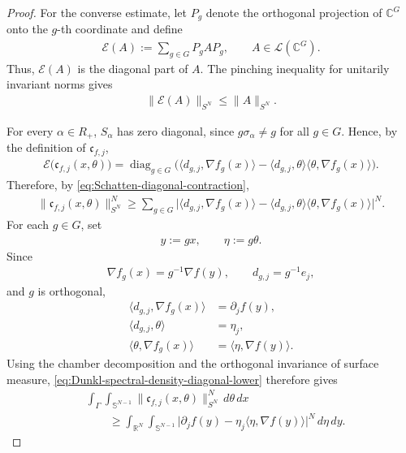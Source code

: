 \documentclass{amsart}
\begin{document}
\begin{proof}
For the converse estimate, let \(P_g\) denote the orthogonal projection
of \(\mathbb C^G\) onto the \(g\)-th coordinate and define
\begin{align*}
\mathcal E(A)
:=
\sum_{g\in G}P_gAP_g,
\qquad
A\in\mathcal L(\mathbb C^G).
\end{align*}
Thus, \(\mathcal E(A)\) is the diagonal part of \(A\). The pinching
inequality for unitarily invariant norms
\cite[p.~97, (IV.51)--(IV.52)]{BhatiaMatrixAnalysis} gives
\begin{align}
\|\mathcal E(A)\|_{S^N}
\leq
\|A\|_{S^N}.
\label{eq:Schatten-diagonal-contraction}
\end{align}

For every \(\alpha\in R_+\), \(S_\alpha\) has zero diagonal, since
\(g\sigma_\alpha\neq g\) for all \(g\in G\). Hence, by the definition
of \(\mathfrak c_{f,j}\),
\begin{align*}
\mathcal E\big(\mathfrak c_{f,j}(x,\theta)\big)
=
\operatorname{diag}_{g\in G}
\bigg(
\langle d_{g,j},\nabla f_g(x)\rangle
-
\langle d_{g,j},\theta\rangle
\langle\theta,\nabla f_g(x)\rangle
\bigg).
\end{align*}
Therefore, by \eqref{eq:Schatten-diagonal-contraction},
\begin{align}
\|\mathfrak c_{f,j}(x,\theta)\|_{S^N}^N
\geq
\sum_{g\in G}
\big|
\langle d_{g,j},\nabla f_g(x)\rangle
-
\langle d_{g,j},\theta\rangle
\langle\theta,\nabla f_g(x)\rangle
\big|^N.
\label{eq:Dunkl-spectral-density-diagonal-lower}
\end{align}
For each \(g\in G\), set
\begin{align*}
y:=gx,
\qquad
\eta:=g\theta.
\end{align*}
Since
\begin{align*}
\nabla f_g(x)
=
g^{-1}\nabla f(y),
\qquad
d_{g,j}=g^{-1}e_j,
\end{align*}
and \(g\) is orthogonal,
\begin{align*}
\langle d_{g,j},\nabla f_g(x)\rangle
&=
\partial_j f(y),\\
\langle d_{g,j},\theta\rangle
&=
\eta_j,\\
\langle\theta,\nabla f_g(x)\rangle
&=
\langle\eta,\nabla f(y)\rangle.
\end{align*}
Using the chamber decomposition and the orthogonal invariance of
surface measure, \eqref{eq:Dunkl-spectral-density-diagonal-lower}
therefore gives
\begin{align}
&\int_\Gamma
\int_{\mathbb S^{N-1}}
\|\mathfrak c_{f,j}(x,\theta)\|_{S^N}^N
\,d\theta\,dx
\nonumber\\
&\qquad\geq
\int_{\mathbb R^N}
\int_{\mathbb S^{N-1}}
\big|
\partial_jf(y)
-
\eta_j\langle\eta,\nabla f(y)\rangle
\big|^N
\,d\eta\,dy.
\label{eq:Dunkl-spectral-density-lower-reduction}
\end{align}


\end{proof}
\end{document}

